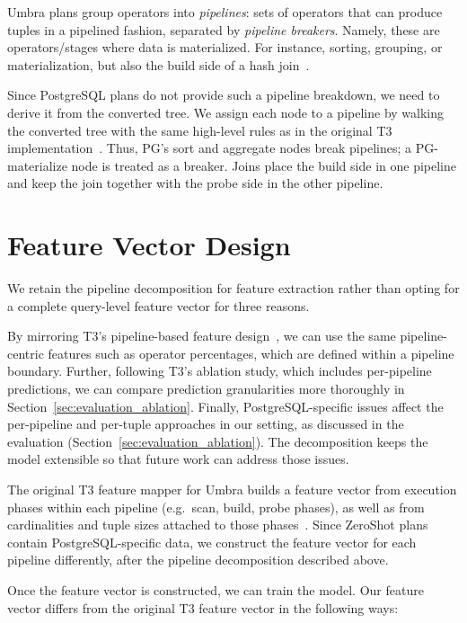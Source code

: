 Umbra plans group operators into \emph{pipelines}: sets of operators that can produce tuples in a pipelined fashion, separated by \emph{pipeline breakers}. 
Namely, these are operators/stages where data is materialized. For instance, sorting, grouping, or materialization, but also the build side of a hash join~\parencite{t3}.

Since PostgreSQL plans do not provide such a pipeline breakdown, we need to derive it from the converted tree.
We assign each node to a pipeline by walking the converted tree with the same high-level rules as in the original T3 implementation~\parencite{t3}.
Thus, PG's sort and aggregate nodes break pipelines; a PG-materialize node is treated as a breaker.
Joins place the build side in one pipeline and keep the join together with the probe side in the other pipeline.

\section{Feature Vector Design}\label{sec:methodology-implementation}

We retain the pipeline decomposition for feature extraction rather than opting for a complete query-level feature vector for three reasons.

By mirroring T3's pipeline-based feature design~\parencite{t3},
we can use the same pipeline-centric features such as operator percentages, which are defined within a pipeline boundary.
Further, following T3's ablation study, which includes per-pipeline predictions, we can compare prediction granularities more thoroughly in Section~\ref{sec:evaluation_ablation}.
Finally, PostgreSQL-specific issues affect the per-pipeline and per-tuple approaches
in our setting, as discussed in the evaluation (Section~\ref{sec:evaluation_ablation}).
The decomposition keeps the model extensible so that future work can address those issues.

The original T3 feature mapper for Umbra builds a feature vector from execution phases within each pipeline (e.g.\ scan, build, probe phases), as well as from cardinalities and tuple sizes attached to those phases~\parencite{t3}.
Since ZeroShot plans contain PostgreSQL-specific data, we construct the feature vector for each pipeline differently, after the pipeline decomposition described above.

Once the feature vector is constructed, we can train the model.
Our feature vector differs from the original T3 feature vector in the following ways:



